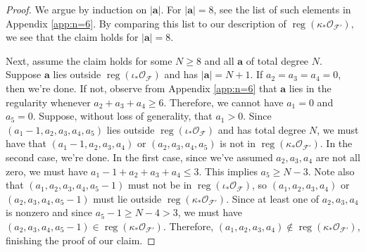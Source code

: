 \documentclass[12pt,reqno]{amsart}
\theoremstyle{definition}
\theoremstyle{remark}
\newcommand{\reg}{\operatorname{reg}}
\newcommand{\calF}{{\mathcal{F}}}
\newcommand{\calO}{{\mathcal{O}}}
\begin{document}
\begin{proof}
    We argue by induction on $|\mathbf a|$.  For $|\mathbf a| = 8$, see the list of such elements in Appendix \ref{app:n=6}.  By comparing this list to our description of $\reg(\kappa_*\calO_{\calF'}),$ we see that the claim holds for $|\mathbf a| = 8$.

    Next, assume the claim holds for some $N \geq 8$ and all $\mathbf a$ of total degree $N$.  Suppose $\mathbf a$ lies outside $\reg(\iota_*\calO_{\calF})$ and has $|\mathbf a| = N+1$.  If $a_2 =a_3=a_4=0$, then we're done.  If not, observe from Appendix \ref{app:n=6} that $\mathbf a$ lies in the regularity whenever $a_2+a_3+a_4 \geq 6$.  Therefore, we
cannot have $a_1 = 0$ and $a_5=0$.  Suppose, without loss of generality, that $a_1 > 0$.  Since $(a_1-1,a_2,a_3,a_4,a_5)$ lies outside   $\reg(\iota_*\calO_{\calF})$ and has total degree $N$, we  must have that $(a_1-1,a_2,a_3,a_4)$ or $(a_2,a_3,a_4,a_5)$ is not in $\reg(\kappa_*\calO_{\calF'}).$   In the second case, we're done.  In the first case, since we've assumed $a_2,a_3,a_4$ are not all zero, we must have $a_1-1+a_2+a_3+a_4 \leq 3$.  This implies $a_5 \geq N-3$.  Note also that $(a_1,a_2,a_3,a_4,a_5-1)$ must not be in $\reg(\iota_*\calO_{\calF})$, so $(a_1,a_2,a_3,a_4)$ or $(a_2,a_3,a_4,a_5-1)$ must lie outside $\reg(\kappa_*\calO_{\calF'})$.  Since at least one of $a_2,a_3,a_4$ is nonzero and since $a_5-1 \geq N-4 > 3$, we must have $(a_2,a_3,a_4,a_5-1) \in \reg(\kappa_*\calO_{\calF'})$.  Therefore, $(a_1,a_2,a_3,a_4) \notin \reg(\kappa_*\calO_{\calF'})$, finishing the proof of our claim.
\end{proof}
\end{document}
